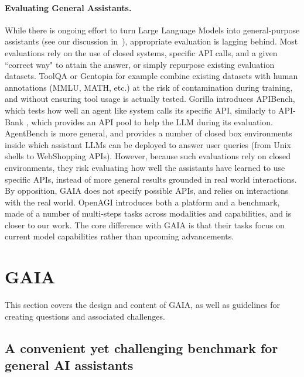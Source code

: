 \documentclass{fairmeta}
\newcommand{\benchmark}{\textsc{GAIA}}
\begin{document}
\paragraph{Evaluating General Assistants.}
While there is ongoing effort to turn Large Language Models into general-purpose assistants (see our discussion in~), appropriate evaluation is lagging behind. Most evaluations
rely on the use of closed systems, specific API calls, and a given ``correct way" to attain the answer, or simply repurpose existing evaluation datasets. ToolQA \citep{_zhuang-etal-2023-toolqa} or Gentopia \citep{_xu-etal-2023-gentopia} for example combine existing datasets with human annotations (MMLU, MATH, etc.) at the risk of contamination during training, and without ensuring tool usage is actually tested. Gorilla \citep{_patil-etal-2023-gorilla} introduces APIBench, which tests how well an agent like system calls its specific API, similarly to API-Bank \citep{_li-etal-2023-apibank}, which provides an API pool to help the LLM during its evaluation. AgentBench \citep{liu2023agentbench} is more general, and provides a number of closed box environments inside which assistant LLMs can be deployed to answer user queries (from Unix shells to WebShopping APIs). However, because such evaluations rely on closed environments, they risk evaluating how well the assistants have learned to use specific APIs, instead of more general results grounded in real world interactions.
By opposition, \benchmark{} does not specify possible APIs, and relies on interactions with the real world.
OpenAGI \citep{_ge_2023_openagi} introduces both a platform and a benchmark, made of a number of multi-steps tasks across modalities and capabilities, and is closer to our work. The core difference with \benchmark{} is that their tasks focus on current model capabilities rather than upcoming advancements.

\section{\benchmark{}}

This section covers the design and content of \benchmark{}, as well as guidelines for creating questions and associated challenges.

\subsection{A convenient yet challenging benchmark for general AI assistants}
\end{document}
